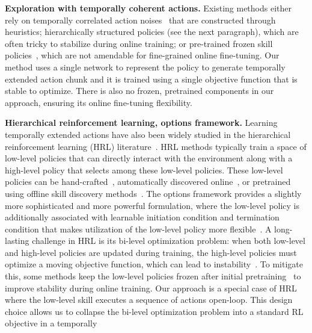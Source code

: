 \textbf{Exploration with temporally coherent actions.} 
Existing methods either rely on temporally correlated action noises~\citep{lillicrap2015continuous} that are constructed through heuristics; hierarchically structured policies (see the next paragraph), which are often tricky to stabilize during online training; or pre-trained frozen skill policies~\citep{pertsch2021accelerating, wilcoxson2024leveraging}, which are not amendable for fine-grained online fine-tuning. Our method uses a single network to represent the policy to generate temporally extended action chunk and it is trained using a single objective function that is stable to optimize. There is also no frozen, pretrained components in our approach, ensuring its online fine-tuning flexibility. 


\textbf{Hierarchical reinforcement learning, options framework.} Learning temporally extended actions have also been widely studied in the hierarchical reinforcement learning (HRL) literature~\citep{dayan1992feudal, dietterich2000hierarchical, vezhnevets2016strategic, daniel2016hierarchical, kulkarni2016hierarchical, vezhnevets2017feudal, peng2017deeploco, riedmiller2018learning, nachum2018data, ajay2020opal, shankar2020learning, pertsch2021accelerating, gehring2021hierarchical, xie2021latent}. HRL methods typically train a space of low-level policies that can directly interact with the environment along with a high-level policy that selects among these low-level policies. These low-level policies can be hand-crafted~\citep{dalal2021accelerating}, automatically discovered online~\citep{dietterich2000hierarchical, kulkarni2016hierarchical, vezhnevets2016strategic, vezhnevets2017feudal, nachum2018data}, or pretrained using offline skill discovery methods~\citep{paraschos2013probabilistic,merel2018neural,shankar2020learning, ajay2020opal, singh2020parrot, pertsch2021accelerating, touati2022does, nasiriany2022learning, hu2023unsupervised, frans2024unsupervised, chen2024self, park2024foundation}. The options framework provides a slightly more sophisticated and more powerful formulation, where the low-level policy is additionally associated with learnable initiation condition and termination condition that makes utilization of the low-level policy more flexible~\citep{sutton1999between, menache2002q, chentanez2004intrinsically, mannor2004dynamic, csimcsek2004using, csimcsek2007betweenness, konidaris2011autonomous, daniel2016hierarchical, srinivas2016option, oh2017value, fox2017multi, bacon2017option, kim2019variational, bagaria2019option, bagaria2024effectively, de2025learning}.  A long-lasting challenge in HRL is its bi-level optimization problem: when both low-level and high-level policies are updated during training, the high-level policies must optimize a moving objective function, which can lead to instability~\citep{nachum2018data}. To mitigate this, some methods keep the low-level policies frozen after initial pretraining~\citep{ajay2020opal, pertsch2021accelerating, wilcoxson2024leveraging} to improve stability during online training. Our approach is a special case of HRL where the low-level skill executes a sequence of actions open-loop. This design choice allows us to collapse the bi-level optimization problem into a standard RL objective in a temporally 